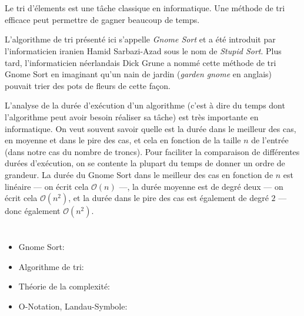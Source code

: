 {{%
\section*{\BrochureItsInformatics}
Le tri d’élements est une tâche classique en informatique. Une méthode de tri efficace peut permettre de gagner beaucoup de temps.

L’algorithme de tri présenté ici s’appelle \emph{Gnome Sort} et a été introduit par l’informaticien iranien Hamid Sarbazi-Azad sous le nom de \emph{Stupid Sort}. Plus tard, l’informaticien néerlandais Dick Grune a nommé cette méthode de tri Gnome Sort en imaginant qu’un nain de jardin (\emph{garden gnome} en anglais) pouvait trier des pots de fleurs de cette façon.

L’analyse de la durée d’exécution d’un algorithme (c’est à dire du temps dont l’algorithme peut avoir besoin réaliser sa tâche) est très importante en informatique. On veut souvent savoir quelle est la durée dans le meilleur des cas, en moyenne et dans le pire des cas, et cela en fonction de la taille ${n}$ de l’entrée (dans notre cas du nombre de troncs). Pour faciliter la comparaison de différentes durées d’exécution, on se contente la plupart du temps de donner un ordre de grandeur. La durée du Gnome Sort dans le meilleur des cas en fonction de ${n}$ est linéaire — on écrit cela ${\mathcal{O}(n)}$ —, la durée moyenne est de degré deux — on écrit cela ${\mathcal{O}(n^2)}$, et la durée dans le pire des cas est également de degré $2$ — donc également ${\mathcal{O}(n^2)}$.



\section*{\BrochureWebsitesAndKeywords}
{\raggedright
\begin{itemize}
  \item Gnome Sort: \href{https://de.wikipedia.org/wiki/Gnomesort}{}
  \item Algorithme de tri: \href{https://fr.wikipedia.org/wiki/Algorithme_de_tri}{}
  \item Théorie de la complexité: \href{https://fr.wikipedia.org/wiki/Th\%C3\%A9orie_de_la_complexit\%C3\%A9_(informatique_th\%C3\%A9orique)\#Relation_au_co\%C3\%BBt_\%C3\%A9nerg\%C3\%A9tique}{}
  \item O-Notation, Landau-Symbole: \href{https://fr.wikipedia.org/wiki/Comparaison_asymptotique}{}
\end{itemize}


}}}
